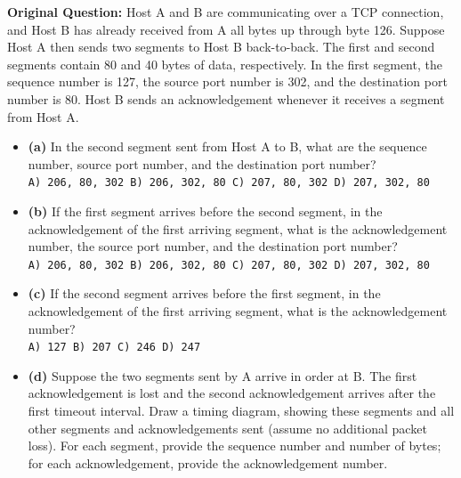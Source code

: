 \textbf{Original Question:} Host A and B are communicating over a TCP connection, and Host B has already received from A all bytes up through byte 126. Suppose Host A then sends two segments to Host B back-to-back. The first and second segments contain 80 and 40 bytes of data, respectively. In the first segment, the sequence number is 127, the source port number is 302, and the destination port number is 80. Host B sends an acknowledgement whenever it receives a segment from Host A.
\begin{itemize}
\item \textbf{(a)} In the second segment sent from Host A to B, what are the sequence number, source port number, and the destination port number? \\
\texttt{A) 206, 80, 302 \quad B) 206, 302, 80 \quad C) 207, 80, 302 \quad D) 207, 302, 80}
\item \textbf{(b)} If the first segment arrives before the second segment, in the acknowledgement of the first arriving segment, what is the acknowledgement number, the source port number, and the destination port number? \\
\texttt{A) 206, 80, 302 \quad B) 206, 302, 80 \quad C) 207, 80, 302 \quad D) 207, 302, 80}
\item \textbf{(c)} If the second segment arrives before the first segment, in the acknowledgement of the first arriving segment, what is the acknowledgement number? \\
\texttt{A) 127 \quad B) 207 \quad C) 246 \quad D) 247}
\item \textbf{(d)} Suppose the two segments sent by A arrive in order at B. The first acknowledgement is lost and the second acknowledgement arrives after the first timeout interval. Draw a timing diagram, showing these segments and all other segments and acknowledgements sent (assume no additional packet loss). For each segment, provide the sequence number and number of bytes; for each acknowledgement, provide the acknowledgement number.
\end{itemize}

